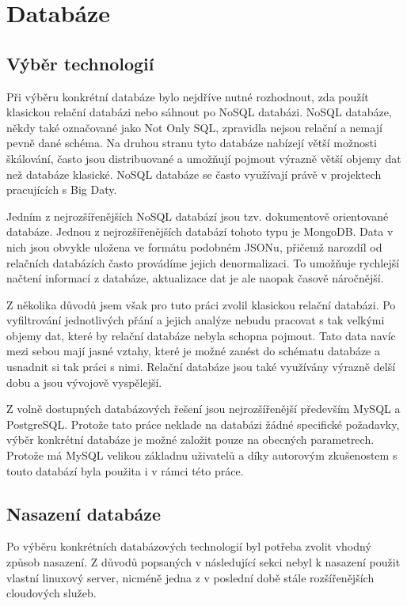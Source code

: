 \documentclass[thesis=B,czech]{FITthesis}[2012/06/26]
\begin{document}
\section{Databáze}
\subsection{Výběr technologií}
	Při výběru konkrétní databáze bylo nejdříve nutné rozhodnout, zda použít klasickou relační databázi nebo sáhnout po NoSQL databázi. NoSQL databáze, někdy také označované jako Not Only SQL, zpravidla nejsou relační a nemají pevně dané schéma. Na druhou stranu tyto databáze nabízejí větší možnosti škálování, často jsou distribuované a umožňují pojmout výrazně větší objemy dat než databáze klasické\cite{nosql-dbs}. NoSQL databáze se často využívají právě v projektech pracujících s Big Daty. 
	
	Jedním z nejrozšířenějších NoSQL databází jsou tzv. dokumentově orientované databáze. Jednou z nejrozšířenějších databází tohoto typu je MongoDB. Data v nich jsou obvykle uložena ve formátu podobném JSONu, přičemž narozdíl od relačních databázích často provádíme jejich denormalizaci. To umožňuje rychlejší načtení informací z databáze, aktualizace dat je ale naopak časově náročnější. 
	
	Z několika důvodů jsem však pro tuto práci zvolil klasickou relační databázi. Po vyfiltrování jednotlivých přání a jejich analýze nebudu pracovat s tak velkými objemy dat, které by relační databáze nebyla schopna pojmout. Tato data navíc mezi sebou mají jasné vztahy, které je možné zanést do schématu databáze a usnadnit si tak práci s nimi. Relační databáze jsou také využívány výrazně delší dobu a jsou vývojově vyspělejší. 
	
	Z volně dostupných databázových řešení jsou nejrozšířenější především MySQL a PostgreSQL. Protože tato práce neklade na databázi žádné specifické požadavky, výběr konkrétní databáze je možné založit pouze na obecných parametrech. Protože má MySQL velikou základnu uživatelů a díky autorovým zkušenostem s touto databází byla použita i v rámci této práce. 
	
\subsection{Nasazení databáze}
	Po výběru konkrétních databázových technologií byl potřeba zvolit vhodný způsob nasazení. Z důvodů popsaných v následující sekci nebyl k nasazení použit vlastní linuxový server, nicméně jedna z v poslední době stále rozšířenějších cloudových služeb. 
	
\end{document}
